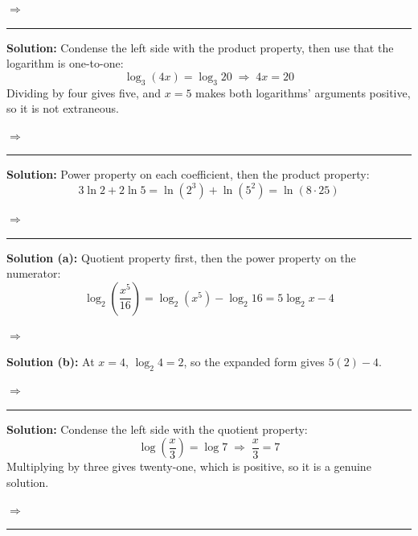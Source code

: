 \documentclass[12pt]{article}
\begin{document}
$\Rightarrow$ 

\vspace{0.15cm}\noindent\rule{\linewidth}{0.2pt}


\textbf{Solution:} Condense the left side with the product property, then use that the logarithm is one-to-one:
\[ \log_3(4x) = \log_3 20 \;\Longrightarrow\; 4x = 20 \]
Dividing by four gives five, and $x = 5$ makes both logarithms' arguments positive, so it is not extraneous.

$\Rightarrow$ 

\vspace{0.15cm}\noindent\rule{\linewidth}{0.2pt}


\textbf{Solution:} Power property on each coefficient, then the product property:
\[ 3\ln 2 + 2\ln 5 = \ln(2^3) + \ln(5^2) = \ln(8 \cdot 25) \]

$\Rightarrow$ 

\vspace{0.15cm}\noindent\rule{\linewidth}{0.2pt}


\textbf{Solution (a):} Quotient property first, then the power property on the numerator:
\[ \log_2\!\left(\frac{x^5}{16}\right) = \log_2(x^5) - \log_2 16 = 5\log_2 x - 4 \]

$\Rightarrow$ 

\textbf{Solution (b):} At $x = 4$, $\log_2 4 = 2$, so the expanded form gives $5(2) - 4$.

$\Rightarrow$ 

\vspace{0.15cm}\noindent\rule{\linewidth}{0.2pt}


\textbf{Solution:} Condense the left side with the quotient property:
\[ \log\!\left(\frac{x}{3}\right) = \log 7 \;\Longrightarrow\; \frac{x}{3} = 7 \]
Multiplying by three gives twenty-one, which is positive, so it is a genuine solution.

$\Rightarrow$ 

\vspace{0.15cm}\noindent\rule{\linewidth}{0.2pt}
\end{document}
